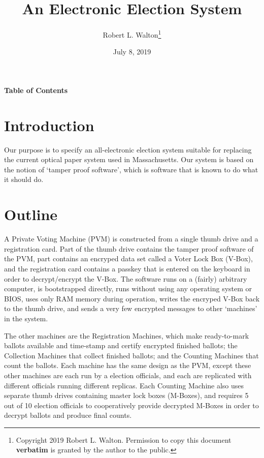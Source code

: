 \documentclass[12pt]{article}
\makeatletter
\renewcommand\tableofcontents{%
    \begin{list}{}%
	     {\setlength{\itemsep}{0in}%
	      \setlength{\topsep}{0in}%
	      \setlength{\parsep}{1ex}%
	      \setlength{\labelwidth}{0in}%
	      \setlength{\baselineskip}{1.5ex}%
	      \setlength{\leftmargin}{0.8in}%
	      \setlength{\rightmargin}{0.8in}}%
    \item\@starttoc{toc}%
    \end{list}}
\makeatother
\begin{document}
        
\title{An Electronic Election System}

\author{Robert L. Walton\thanks{Copyright 2019 Robert L. Walton.
Permission to copy this document {\bf verbatim} is granted by the author
to the public.}}

\date{July 8, 2019}

\maketitle

\begin{center}
\large \bf Table of Contents
\end{center}

\bigskip

\tableofcontents 

\newpage

\section{Introduction}

Our purpose is to specify an all-electronic election system
suitable for replacing the current optical paper system
used in Massachusetts.  Our system is based on the notion
of `tamper proof software', which is software that is
known to do what it should do.

\section{Outline}

A Private Voting Machine
(PVM) is constructed from a single thumb drive and a
registration card.  Part of the thumb drive contains the
tamper proof software of the PVM, part contains an encryped
data set called a Voter Lock Box (V-Box), and the registration
card contains a passkey that is entered on the keyboard in
order to decrypt/encrypt the V-Box.  The software runs on
a (fairly) arbitrary computer, is bootstrapped directly,
runs without using any operating system or BIOS,
uses only RAM memory during operation,
writes the encryped V-Box back to the thumb drive, and sends
a very few encrypted messages to other `machines' in the
system.

The other machines are the Registration Machines, which make
ready-to-mark ballots available and time-stamp and certify
encrypted finished ballots; the Collection Machines that collect
finished ballots; and the Counting Machines that count the
ballots.  Each machine has the same design as the PVM, except
these other machines are each run by a election officials, and
each are replicated with different officials running different
replicas.  Each Counting Machine also uses separate
thumb drives containing master lock boxes
(M-Boxes), and requires 5 out of 10 election officials to cooperatively
provide decrypted M-Boxes in order to decrypt ballots and
produce final counts.
\end{document}
